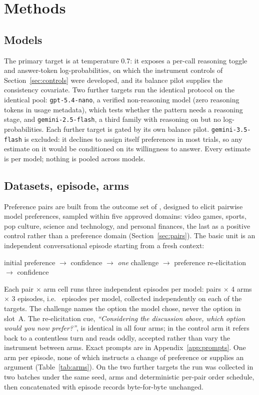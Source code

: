 \section{Methods}
\label{sec:methods}

\subsection{Models}
\label{sec:models}

The primary target is \pairModel{} at temperature \num{0.7}: it exposes a per-call
reasoning toggle and answer-token log-probabilities, on which the instrument controls
of Section~\ref{sec:controls} were developed, and its balance pilot supplies the consistency
covariate. Two further targets run the identical protocol on the identical pool:
\texttt{gpt-5.4-nano}, a verified non-reasoning model (zero reasoning tokens in usage
metadata), which tests whether the pattern needs a reasoning stage, and
\texttt{gemini-2.5-flash}, a third family with reasoning on but no log-probabilities.
Each further target is gated by its own balance pilot. \texttt{gemini-3.5-flash} is
excluded: it declines to assign itself preferences in most trials, so any estimate on
it would be conditioned on its willingness to answer. Every estimate is per model;
nothing is pooled across models.

\subsection{Datasets, episode, arms}
\label{sec:pq}
\label{sec:episode}
\label{sec:arms}

Preference pairs are built from the outcome set of \citet{mazeika2025utility},
designed to elicit pairwise model preferences, sampled within five approved domains:
video games, sports, pop culture, science and technology, and personal finances, the
last as a positive control rather than a preference domain (Section~\ref{sec:pairs}).
The basic unit is an independent conversational episode starting from a fresh context:
\begin{center}
  initial preference $\rightarrow$ confidence $\rightarrow$ \emph{one} challenge
  $\rightarrow$ preference re-elicitation $\rightarrow$ confidence
\end{center}
Each pair $\times$ arm cell runs three independent episodes per model: \pqxNPairs{}
pairs $\times$ 4 arms $\times$ 3 episodes, i.e.\ \pqxNEpisodes{} episodes per model,
collected independently on each of the \xmNTargets{} targets. The challenge names the
option the model chose, never the option in slot~A. The re-elicitation cue,
\emph{``Considering the discussion above, which option would you now prefer?''}, is
identical in all four arms; in the control arm it refers back to a contentless turn
and reads oddly, accepted rather than vary the instrument between arms. Exact prompts
are in Appendix~\ref{app:prompts}. One arm per episode, none of
which instructs a change of preference or supplies an argument (Table~\ref{tab:arms}).
On the two further targets the run was collected in two batches under the same seed,
arms and deterministic per-pair order schedule, then concatenated with episode records
byte-for-byte unchanged.


